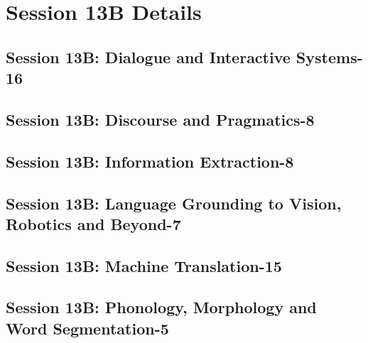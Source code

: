 \section{Session 13B Details}
\subsection{\large Session 13B: Dialogue and Interactive Systems-16}
\label{parallel-session-13B-trackA}
\TrackALoc\hfill\sessionchair{}{}
\clearpage
\subsection{\large Session 13B: Discourse and Pragmatics-8}
\label{parallel-session-13B-trackB}
\TrackBLoc\hfill\sessionchair{}{}
\clearpage
\subsection{\large Session 13B: Information Extraction-8}
\label{parallel-session-13B-trackC}
\TrackCLoc\hfill\sessionchair{}{}
\clearpage
\subsection{\large Session 13B: Language Grounding to Vision, Robotics and Beyond-7}
\label{parallel-session-13B-trackD}
\TrackDLoc\hfill\sessionchair{}{}
\clearpage
\subsection{\large Session 13B: Machine Translation-15}
\label{parallel-session-13B-trackE}
\TrackELoc\hfill\sessionchair{}{}
\clearpage
\subsection{\large Session 13B: Phonology, Morphology and Word Segmentation-5}
\label{parallel-session-13B-trackF}
\TrackFLoc\hfill\sessionchair{}{}
\clearpage
